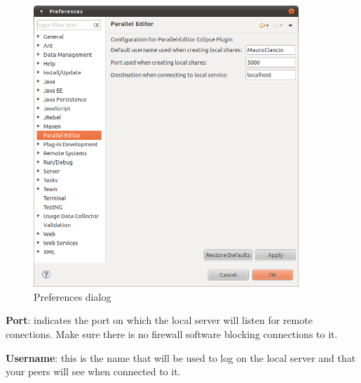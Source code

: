 \begin{figure}[!ht]
	\begin{center}
		\includegraphics[width=10cm]{preferences.png}
		\caption{\label{preferencias} Preferences dialog}
	\end{center}
\end{figure}

\textbf{Port}: indicates the port on which the local server will listen for remote conections. Make sure
there is no firewall software blocking connections to it.

\textbf{Username}: this is the name that will be used to log on the local server and that your peers will
see when connected to it.

